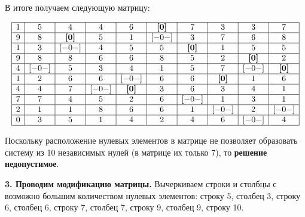 \documentclass[17pt]{extarticle}
\begin{document}
В итоге получаем следующую матрицу:

\[
    \begin{array}{|*{10}{c|}}
        \hline
        1 & 5     & 4            & 4     & 6            & \textbf{[0]} & 7            & 3            & 3            & 7            \\
        \hline
        9 & 8     & \textbf{[0]} & 5     & 1            & [-0-]        & 3            & 7            & 6            & 8            \\
        \hline
        1 & 3     & [-0-]        & 4     & 5            & 5            & \textbf{[0]} & 1            & 5            & 5            \\
        \hline
        9 & 8     & 8            & 6     & 6            & 8            & 5            & 2            & \textbf{[0]} & 2            \\
        \hline
        4 & [-0-] & 5            & 3     & 4            & 1            & 5            & 7            & [-0-]        & \textbf{[0]} \\
        \hline
        1 & 2     & 6            & 6     & [-0-]        & 6            & 6            & \textbf{[0]} & 1            & 6            \\
        \hline
        4 & 4     & 7            & [-0-] & \textbf{[0]} & 3            & 6            & 3            & 4            & 1            \\
        \hline
        7 & 7     & 4            & 5     & 2            & 6            & [-0-]        & 1            & 3            & 1            \\
        \hline
        2 & 1     & 1            & 8     & 6            & 6            & 1            & [-0-]        & 2            & [-0-]        \\
        \hline
        0 & 3     & 5            & 1     & 4            & 2            & 4            & 6            & [-0-]        & 4            \\
        \hline
    \end{array}
\]

Поскольку расположение нулевых элементов в матрице не позволяет образовать систему из 10 независимых нулей (в матрице их только 7), то \textbf{решение недопустимое}.

\textbf{3. Проводим модификацию матрицы.} Вычеркиваем строки и столбцы с возможно большим количеством нулевых элементов:
строку 5, столбец 3, строку 6, столбец 6, строку 7, столбец 7, строку 9, столбец 9, строку 10.
\end{document}
